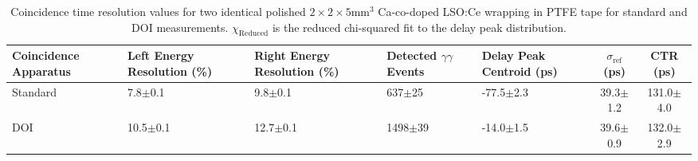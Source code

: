 \begin{table}
\caption{\label{tab:referencevals} Coincidence time resolution values for two identical polished $2\times2\times5$mm$^3$ Ca-co-doped LSO:Ce wrapping in PTFE tape for standard and DOI measurements. $\chi_\text{Reduced}$ is the reduced chi-squared fit to the delay peak distribution.}
\begin{tabular}{p{1.8cm}p{2.3cm}p{2.3cm}p{1.7cm}p{2.2cm}cc}
Coincidence Apparatus & Left Energy Resolution (\%) & Right Energy Resolution (\%) & Detected $\gamma\gamma$ Events & Delay Peak Centroid (ps) & $\sigma_\textrm{ref}$ (ps) & CTR (ps)\\
\hline
Standard &   7.8$\pm$0.1 &   9.8$\pm$0.1 &   637$\pm$25 &  -77.5$\pm$2.3 &   39.3$\pm$1.2 &  131.0$\pm$4.0 \\
     DOI &  10.5$\pm$0.1 &  12.7$\pm$0.1 &  1498$\pm$39 &  -14.0$\pm$1.5 &   39.6$\pm$0.9 &  132.0$\pm$2.9 \\
\hline
\end{tabular}
\end{table}
